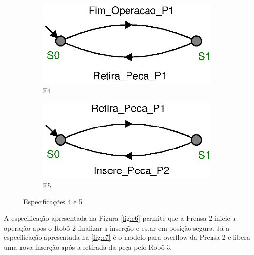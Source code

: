 \begin{figure}[H]%
  \centering
  \begin{subfigure}[b]{0.45\textwidth}
      \centering
      \includegraphics[width=\textwidth]{imagens/E4.eps}
      \caption{E4}
      \label{fig:e4}
  \end{subfigure}
  \hfill
  \begin{subfigure}[b]{0.45\textwidth}
      \centering
      \includegraphics[width=\textwidth]{imagens/E5.eps}
      \caption{E5}
      \label{fig:e5}
  \end{subfigure}
  \caption{Especificações 4 e 5}
  \label{fig:e45}
\end{figure}

A especificação apresentada na Figura \ref{fig:e6} permite que a Prensa 2 inicie a operação após o Robô 2 finalizar a inserção e estar em posição segura.
Já a especificação apresentada na \ref{fig:e7} é o modelo para overflow da Prensa 2 e libera uma nova inserção após a retirada da peça pelo Robô 3.

